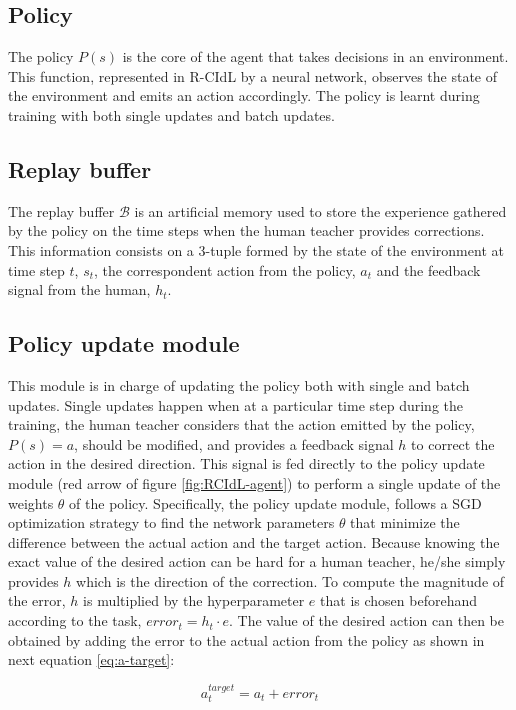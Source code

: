 \subsection*{Policy}

The policy $P(s)$ is the core of the agent that takes decisions in an environment. This function, represented in R-CIdL by a neural network, observes the state of the environment and emits an action accordingly. The policy is learnt during training with both single updates and batch updates. 


\subsection*{Replay buffer}
The replay buffer $\mathcal{B}$ is an artificial memory  used to store the experience gathered by the policy on the time steps when the human teacher provides corrections. This information consists on a 3-tuple formed by the state of the environment at time step $t$,  $s_t$, the correspondent action from the policy, $a_t$ and the feedback signal from the human, $h_t$. 

\subsection*{Policy update module}
This module is in charge of updating the policy both with single and batch updates.
Single updates happen when at a particular time step during the training, the human teacher considers that the action emitted by the policy, $P(s) = a$, should be modified, and provides a feedback signal $h$ to correct the action in the desired direction. This signal is fed directly to the policy update module (red arrow of figure \ref{fig:RCIdL-agent}) to perform a single update of the weights $\theta$ of the policy. Specifically, the policy update module, follows a SGD optimization strategy to find the network parameters $\theta$ that minimize the difference between the actual action and the target action. Because knowing the exact value of the desired action can be hard for a human teacher, he/she simply provides $h$ which is the direction of the correction. To compute the magnitude of the error, $h$ is multiplied by the hyperparameter $e$ that is chosen beforehand according to the task, ${error}_t = h_t \cdot  e$. The value of the desired action can then be obtained by adding the error to the actual action from the policy as shown in next equation \ref{eq:a-target}:

\begin{equation}
a^{target}_t = a_t + {error}_t
\label{eq:a-target}
\end{equation}


